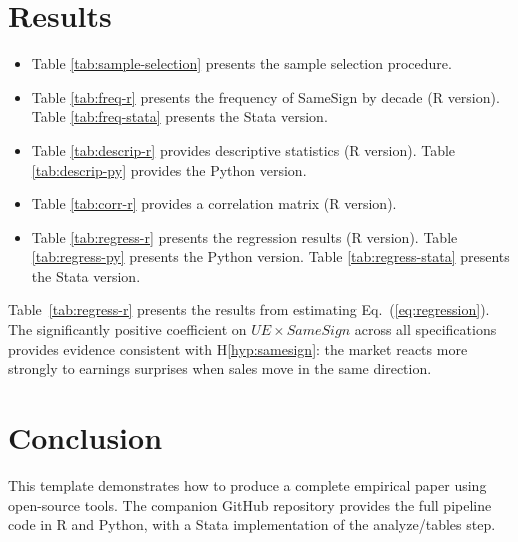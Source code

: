 \documentclass[english,authoryear,IEEEtran,12pt]{article}
\begin{document}
\section{Results}\label{section-results}

\begin{itemize}
    \item Table \ref{tab:sample-selection} presents the sample selection procedure.
    \item Table \ref{tab:freq-r} presents the frequency of SameSign by decade (R version). Table \ref{tab:freq-stata} presents the Stata version.
    \item Table \ref{tab:descrip-r} provides descriptive statistics (R version). Table \ref{tab:descrip-py} provides the Python version.
    \item Table \ref{tab:corr-r} provides a correlation matrix (R version).
    \item Table \ref{tab:regress-r} presents the regression results (R version). Table \ref{tab:regress-py} presents the Python version. Table \ref{tab:regress-stata} presents the Stata version.
\end{itemize}

Table~\ref{tab:regress-r} presents the results from estimating Eq.~(\ref{eq:regression}). The significantly positive coefficient on $UE \times SameSign$ across all specifications provides evidence consistent with H\ref{hyp:samesign}: the market reacts more strongly to earnings surprises when sales move in the same direction.


\section{Conclusion}\label{section-conclusion}

This template demonstrates how to produce a complete empirical paper using open-source tools. The companion GitHub repository provides the full pipeline code in R and Python, with a Stata implementation of the analyze/tables step.


\newpage
\begin{singlespace}
\printbibliography
\end{singlespace}



\clearpage\newpage
\setcounter{table}{0}
\makeatletter
\renewcommand{\thetable}{A.\arabic{table}}
\setcounter{figure}{0}
\makeatletter
\renewcommand{\thefigure}{A.\arabic{figure}}
\end{document}
